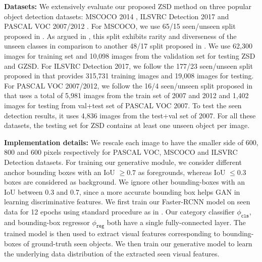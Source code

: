 \documentclass[runningheads]{llncs}
\begin{document}
\noindent\textbf{Datasets:} We extensively evaluate our proposed ZSD method on three popular object detection datasets: MSCOCO 2014 \cite{MSCOCO_2014}, ILSVRC Detection 2017 \cite{ILSVRC_2015} and PASCAL VOC 2007/2012 \cite{VOC_IJCV_2010}. For MSCOCO, we use 65/15 seen/unseen split proposed in \cite{rahman2018polarity}. As argued in \cite{rahman2018polarity}, this split exhibits rarity and diverseness of the unseen classes in comparison to another 48/17 split proposed in \cite{bansal2018zero}. 
We use 62,300 images for training set and 10,098 images from the validation set for testing ZSD and GZSD. For ILSVRC Detection 2017, we follow the 177/23 seen/unseen split proposed in \cite{rahman2018zero} that provides 315,731 training images and 19,008 images for testing. For PASCAL VOC 2007/2012, we follow the 16/4 seen/unseen split proposed in \cite{demirel2018zero} that uses a total of 5,981 images from the train set of 2007 and 2012 and 1,402 images for testing from val+test set of PASCAL VOC 2007. To test the seen detection results, it uses 4,836 images from the test+val set of 2007. For all these datasets, the testing set for ZSD contains at least one unseen object per image.

\noindent\textbf{Implementation details:} We rescale each image to have the smaller side of {600, 800 and 600} pixels respectively for PASCAL VOC, MSCOCO and ILSVRC Detection datasets. For training our generative module, we consider different anchor bounding boxes with an IoU $\ge 0.7$ as foregrounds, whereas IoU $\le 0.3$ boxes are considered as background. We ignore other bounding-boxes with an IoU between 0.3 and 0.7, since a more accurate bounding box helps GAN in learning discriminative features. We first train our Faster-RCNN model on seen data for {12} epochs using standard procedure as in \cite{mmdetection}. Our category classifier $\phi_{\texttt{cls}}$, and bounding-box regressor $\phi_{\texttt{reg}}$ both have a single fully-connected layer. The trained model is then used to extract visual features corresponding to bounding-boxes of ground-truth seen objects. We then train our generative model to learn the underlying data distribution of the extracted seen visual features. 
\end{document}
